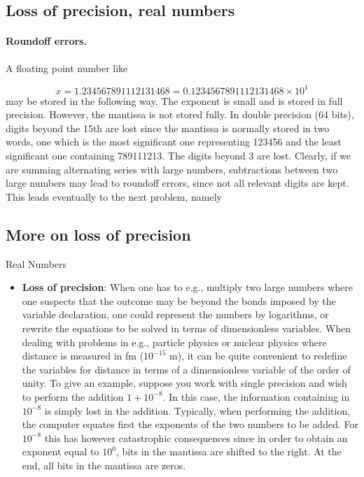 \documentclass[%
oneside,                 %
final,                   %
10pt]{article}
\begin{document}
\subsection{Loss of precision, real numbers}



\paragraph{Roundoff errors.}
A floating point number like

\begin{equation}
   x= 1.234567891112131468 = 0.1234567891112131468\times 10^{1}
\end{equation}
may be stored in the following way. The exponent is  small
and is stored in full precision. However,
the mantissa is not stored fully. In double precision (64 bits), digits
beyond the
15th are lost since the mantissa is normally stored in two words,
one which is the most significant one representing
123456 and the least significant one containing 789111213. The digits
beyond 3 are lost. Clearly, if we are summing alternating series
with large numbers, subtractions between two large numbers may lead
to roundoff errors, since not all relevant digits are kept.
This leads eventually to the next problem, namely

\subsection{More on loss of precision}

\begin{block}{Real Numbers }

\begin{itemize}
  \item \textbf{Loss of precision}: When one has to e.g., multiply two large numbers where one suspects that the outcome may be beyond the bonds imposed by the variable declaration, one could represent the numbers by logarithms, or rewrite the equations to be solved in terms of dimensionless variables. When dealing with problems in e.g., particle physics or nuclear physics where distance is measured in fm ($10^{-15}$ m), it can be quite convenient to redefine the variables for distance in terms of a dimensionless variable of the order of unity. To give an example, suppose you work with single precision and wish to perform the addition $1+10^{-8}$. In this case, the information containing in $10^{-8}$ is simply lost in the addition. Typically, when performing the addition, the computer equates first the exponents of the two numbers to be added. For $10^{-8}$ this has however catastrophic consequences since in order to obtain an exponent equal to $10^0$, bits in the mantissa are shifted to the right. At the end, all bits in the mantissa are zeros.
\end{itemize}

\noindent
\end{block}
\end{document}
